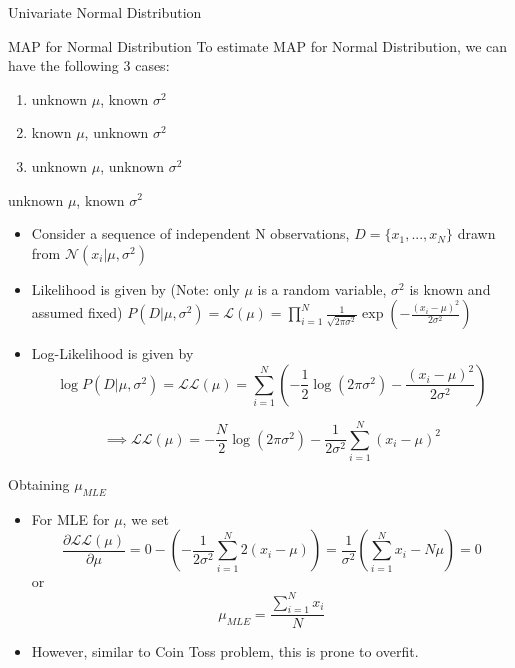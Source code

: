 \documentclass{beamer}
\begin{document}
\begin{section}{Univariate Normal Distribution}
    \begin{frame}{MAP for Normal Distribution}
        To estimate MAP for Normal Distribution, we can have the following 3 cases:
        \begin{enumerate}
            \item unknown $\mu$, known $\sigma^2$
            \item known $\mu$, unknown $\sigma^2$
            \item unknown $\mu$, unknown $\sigma^2$
        \end{enumerate}
    \end{frame}

    \begin{frame}{unknown $\mu$, known $\sigma^2$}
        \begin{itemize}
            \item Consider a sequence of independent N observations, $D = \{ x_1, ... , x_N \}$ drawn from $\mathcal{N} (x_i | \mu, \sigma^2)$
            \pause
            \item Likelihood is given by (Note: only $\mu$ is a random variable, $\sigma^2$ is known and assumed fixed) $P (D | \mu, \sigma^2) = \mathcal{L} (\mu) = \prod_{i=1}^{N} \frac{1}{\sqrt{2 \pi \sigma^2}} \exp \left( - \frac{(x_i - \mu)^2}{2 \sigma^2} \right)$
            \pause
            \item Log-Likelihood is given by 
            $$
            \log P (D | \mu, \sigma^2) = \mathcal{LL} (\mu) = \sum_{i=1}^{N} \left( - \frac{1}{2} \log (2 \pi \sigma^2) - \frac{(x_i - \mu)^2}{2 \sigma^2} \right)
            $$
            
            $$
            \implies \mathcal{LL} (\mu) = - \frac{N}{2} \log (2 \pi \sigma^2) - \frac{1}{2 \sigma^2} \sum_{i=1}^{N} (x_i - \mu)^2
            $$
        \end{itemize}
    \end{frame}

    \begin{frame}{Obtaining $\mu_{MLE}$}
        \begin{itemize}
            \item For MLE for $\mu$, we set
            $$
            \frac{\partial \mathcal{LL} (\mu)}{\partial \mu} = 0 - \left( - \frac{1}{2 \sigma^2} \sum_{i = 1}^{N} 2 (x_i - \mu) \right) = \frac{1}{\sigma^2} (\sum_{i = 1}^{N} x_i - N \mu) = 0
            $$
            or
            $$
            \mu_{MLE} = \frac{\sum_{i = 1}^{N} x_i}{N} 
            $$
            \pause
            \item However, similar to Coin Toss problem, this is prone to overfit.
        \end{itemize}
    \end{frame}


\end{section}
\end{document}
